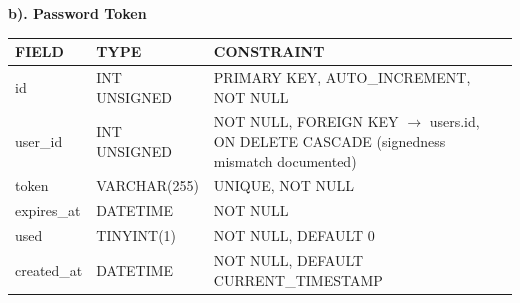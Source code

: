 \vspace{0.4cm}

\noindent\textbf{b). Password Token}
\vspace{0.2cm}
\begin{center}
    \renewcommand{\arraystretch}{1.3}
    \begin{tabular}{|>{\raggedright\arraybackslash}p{3.0cm}|>{\raggedright\arraybackslash}p{4.5cm}|>{\raggedright\arraybackslash}p{8.5cm}|}
        \hline
        \rowcolor{lightgray!50}
        \textbf{FIELD} & \textbf{TYPE} & \textbf{CONSTRAINT}                                                                              \\ \hline
        id             & INT UNSIGNED  & PRIMARY KEY, AUTO\_INCREMENT, NOT NULL                                                           \\ \hline
        user\_id       & INT UNSIGNED  & NOT NULL, FOREIGN KEY $\rightarrow$ users.id, ON DELETE CASCADE (signedness mismatch documented) \\ \hline
        token          & VARCHAR(255)  & UNIQUE, NOT NULL                                                                                 \\ \hline
        expires\_at    & DATETIME      & NOT NULL                                                                                         \\ \hline
        used           & TINYINT(1)    & NOT NULL, DEFAULT 0                                                                              \\ \hline
        created\_at    & DATETIME      & NOT NULL, DEFAULT CURRENT\_TIMESTAMP                                                             \\ \hline
    \end{tabular}
\end{center}

